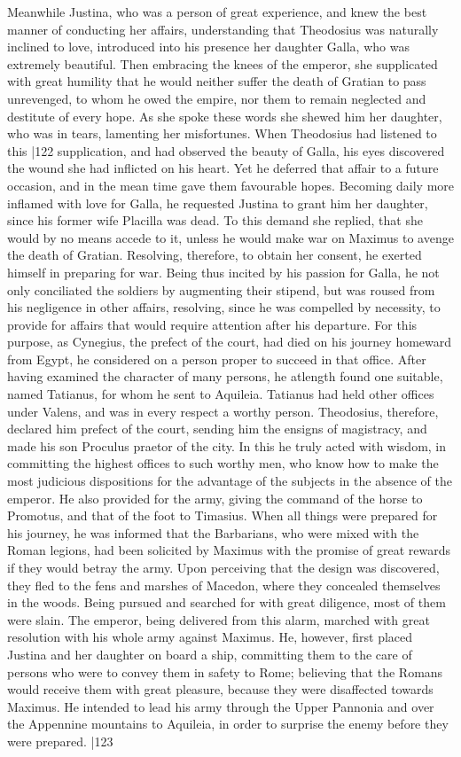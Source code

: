 Meanwhile Justina, who was a person of great experience, and knew the best manner of conducting her affairs, understanding that Theodosius was naturally inclined to love, introduced into his presence her daughter Galla, who was extremely beautiful. Then embracing the knees of the emperor, she supplicated with great humility that he would neither suffer the death of Gratian to pass unrevenged, to whom he owed the empire, nor them to remain neglected and destitute of every hope. As she spoke these words she shewed him her daughter, who was in tears, lamenting her misfortunes. When Theodosius had listened to this
|122 supplication, and had observed the beauty of Galla, his eyes discovered the wound she had inflicted on his heart. Yet he deferred that affair to a future occasion, and in the mean time gave them favourable hopes. Becoming daily more inflamed with love for Galla, he requested Justina to grant him her daughter, since his former wife Placilla was dead. To this demand she replied, that she would by no means accede to it, unless he would make war on Maximus to avenge the death of Gratian. Resolving, therefore, to obtain her consent, he exerted himself in preparing for war. Being thus incited by his passion for Galla, he not only conciliated the soldiers by augmenting their stipend, but was roused from his negligence in other affairs, resolving, since he was compelled by necessity, to provide for affairs that would require attention after his departure. For this purpose, as Cynegius, the prefect of the court, had died on his journey homeward from Egypt, he considered on a person proper to succeed in that office. After having examined the character of many persons, he at\emph{}length found one suitable, named Tatianus, for whom he sent to Aquileia. Tatianus had held other offices under Valens, and was in every respect a worthy person. Theodosius, therefore, declared him prefect of the court, sending him the ensigns of magistracy, and made his son Proculus praetor of the city. In this he truly acted with wisdom, in committing the highest offices to such worthy men, who know how to make the most judicious dispositions for the advantage of the subjects in the absence of the emperor. He also provided for the army, giving the command of the horse to Promotus, and that of the foot to Timasius. When all things were prepared for his journey, he was informed that the Barbarians, who were mixed with the Roman legions, had been solicited by Maximus with the promise of great rewards if they would betray the army. Upon perceiving that the design was discovered, they fled to the fens and marshes of Macedon, where they concealed themselves in the woods. Being pursued and searched for with great diligence, most of them were slain. The emperor, being delivered from this alarm, marched with great resolution with his whole army against Maximus. He, however, first placed Justina and her daughter on board a ship, committing them to the care of persons who were to convey them in safety to Rome; believing that the Romans would receive them with great pleasure, because they were disaffected towards Maximus. He intended to lead his army through the Upper Pannonia and over the Appennine mountains to Aquileia, in order to surprise the enemy before they were prepared.
|123

